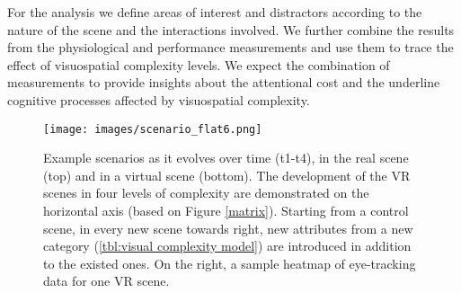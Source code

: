 \documentclass[a4paper]{article}
\begin{document}
 For the analysis we define areas of interest and distractors according to the nature of the scene and the interactions involved. We further combine the results from the physiological and performance measurements and use them to trace the effect of visuospatial complexity levels. We expect the combination of measurements to provide  insights about the attentional cost and the underline cognitive processes affected by visuospatial complexity. 
\smallskip

 \begin{figure}[t]
 \begin{center}
\texttt{[image: images/scenario\_flat6.png]}
 \caption{\sffamily\footnotesize Example scenarios as it evolves over time (t1-t4), in the real scene (top) and in a virtual scene (bottom). The development of the VR scenes in four levels of complexity are demonstrated on the horizontal axis (based on Figure \ref{matrix}). Starting from a control scene, in every new scene towards right, new attributes from a new category (\ref{tbl:visual complexity model}) are introduced in addition to the existed ones. On the right, a sample heatmap of eye-tracking data for one VR scene.}
 \label{scenario1}
 \end{center}
 \end{figure}
 


 \smallskip




 
\end{document}
